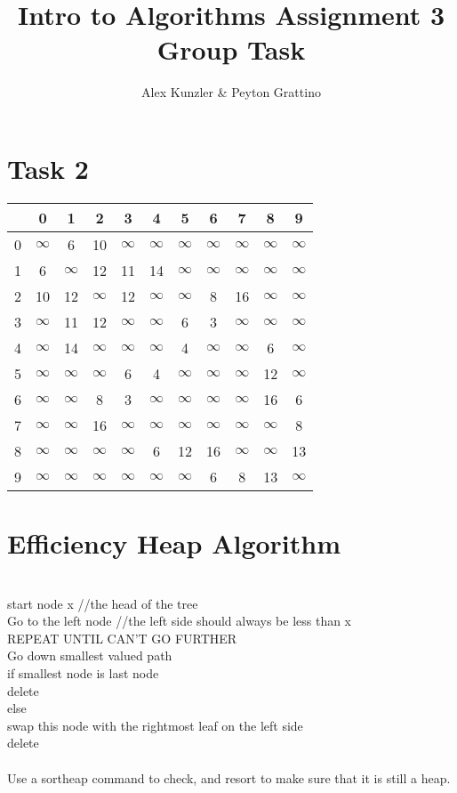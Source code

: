 \documentclass[12pt]{amsart}
\title{Intro to Algorithms Assignment 3 Group Task}
\author{Alex Kunzler \& Peyton Grattino}
\date{} %
\begin{document}
\maketitle
\tableofcontents
{}

\pagebreak
\setcounter{secnumdepth}{1}
\section{Task 2}
\begin{center}
\begin{tabular}{| c | c | c | c | c | c | c | c | c | c | c |}
\hline
& 0 & 1 & 2 & 3 & 4 & 5 & 6 & 7 & 8 & 9 \\
\hline
0 & $\infty$ & 6 & 10 & $\infty$ & $\infty$ & $\infty$ & $\infty$ & $\infty$ & $\infty$ & $\infty$ \\
\hline
1 & 6 & $\infty$ & 12 & 11 & 14 & $\infty$ & $\infty$ & $\infty$ & $\infty$ & $\infty$ \\
\hline
2 & 10 & 12 & $\infty$ & 12 & $\infty$ & $\infty$ & 8 & 16 & $\infty$ & $\infty$ \\
\hline
3 & $\infty$ & 11 & 12 & $\infty$ & $\infty$ & 6 & 3 & $\infty$ & $\infty$ & $\infty$ \\
\hline
4 & $\infty$ & 14 & $\infty$ & $\infty$ & $\infty$ & 4 & $\infty$ & $\infty$ & 6 & $\infty$ \\
\hline
5 & $\infty$ & $\infty$ & $\infty$ & 6 & 4 & $\infty$ & $\infty$ & $\infty$ & 12 & $\infty$ \\
\hline
6 & $\infty$ & $\infty$ & 8 & 3 & $\infty$ & $\infty$ & $\infty$ & $\infty$ & 16 & 6 \\
\hline
7 & $\infty$ & $\infty$ & 16 & $\infty$ & $\infty$ & $\infty$ & $\infty$ & $\infty$ & $\infty$ & 8 \\
\hline
8 & $\infty$ & $\infty$ & $\infty$ & $\infty$ & 6 & 12 &16 & $\infty$ & $\infty$ & 13 \\
\hline
9 & $\infty$ & $\infty$ & $\infty$ & $\infty$ & $\infty$ & $\infty$ & 6 & 8 & 13 & $\infty$ \\
\hline
\end{tabular}
\end{center}

\section{Efficiency Heap Algorithm}
\leavevmode \\
start node x //the head of the tree \\
Go to the left node //the left side should always be less than x \\
REPEAT UNTIL CAN'T GO FURTHER \\
Go down smallest valued path\\
if smallest node is last node\\
\indent delete\\
else\\
\indent swap this node with the rightmost leaf on the left side\\
\indent delete\\
\\
Use a sortheap command to check, and resort to make sure that it is still a heap.
\end{document}
